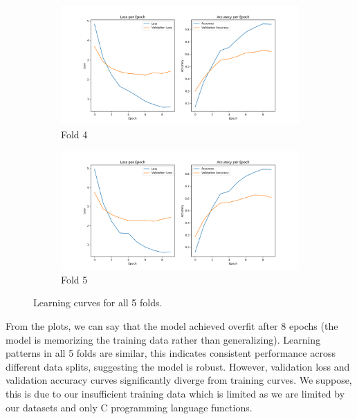 \documentclass[10pt,english,a4paper]{report}
\begin{document}
\begin{figure}[!ht]
    \vspace{1em}
    
    \begin{subfigure}[b]{0.4\textwidth}
        \includegraphics[width=\textwidth]{figures/training/learning_curve_fold_4.png}
        \caption{Fold 4}
        \label{fig:plot4}
    \end{subfigure}
    \hfill
    \begin{subfigure}[b]{0.4\textwidth}
        \includegraphics[width=\textwidth]{figures/training/learning_curve_fold_5.png}
        \caption{Fold 5}
        \label{fig:plot5}
    \end{subfigure}
    
    \caption{Learning curves for all 5 folds.}
    \label{fig:all_folds}
\end{figure}

From the plots, we can say that the model achieved overfit after 8 epochs
(the model is memorizing the training data rather than generalizing). 
Learning patterns in all 5 folds are similar, this indicates consistent 
performance across different data splits, suggesting the model is robust.
However, validation loss and validation accuracy curves significantly diverge from 
training curves. We suppose, this is due to our insufficient training data which is limited 
as we are limited by our datasets and only C programming language functions.
\end{document}
